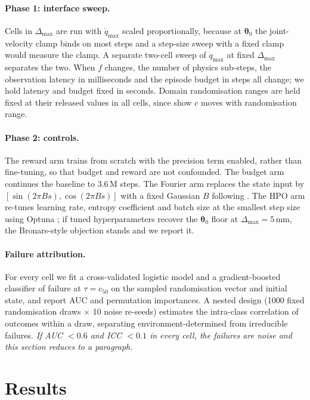\documentclass{article}
\newcommand{\planned}[1]{{\color{blue!70!black}\textit{#1}}}
\newcommand{\dmax}{\Delta_{\max}}
\newcommand{\qdmax}{\dot q_{\max}}
\newcommand{\iface}{\boldsymbol{\theta}}
\begin{document}
\paragraph{Phase 1: interface sweep.}
Cells in $\dmax$ are run with $\qdmax$ scaled proportionally, because at $\iface_0$ the joint-velocity clamp binds on most steps and a step-size sweep with a fixed clamp would measure the clamp. A separate two-cell sweep of $\qdmax$ at fixed $\dmax$ separates the two. When $f$ changes, the number of physics sub-steps, the observation latency in milliseconds and the episode budget in steps all change; we hold latency and budget fixed in seconds. Domain randomisation ranges are held fixed at their released values in all cells, since \citet{xu2026curse} show $c$ moves with randomisation range.

\paragraph{Phase 2: controls.}
The reward arm trains from scratch with the precision term enabled, rather than fine-tuning, so that budget and reward are not confounded. The budget arm continues the baseline to $3.6$\,M steps. The Fourier arm replaces the state input by $[\sin(2\pi B s), \cos(2\pi B s)]$ with a fixed Gaussian $B$ following \citet{gyenes2026fourier}. The HPO arm re-tunes learning rate, entropy coefficient and batch size at the smallest step size using Optuna \citep{akiba2019optuna}; if tuned hyperparameters recover the $\iface_0$ floor at $\dmax{=}5$\,mm, the Bronars-style objection stands and we report it.

\paragraph{Failure attribution.}
\label{sec:attrib}
For every cell we fit a cross-validated logistic model and a gradient-boosted classifier of failure at $\tau{=}c_{50}$ on the sampled randomisation vector and initial state, and report AUC and permutation importances. A nested design (1000 fixed randomisation draws $\times$ 10 noise re-seeds) estimates the intra-class correlation of outcomes within a draw, separating environment-determined from irreducible failures. \planned{If AUC $<0.6$ and ICC $<0.1$ in every cell, the failures are noise and this section reduces to a paragraph.}

\section{Results}
\label{sec:results}
\end{document}
